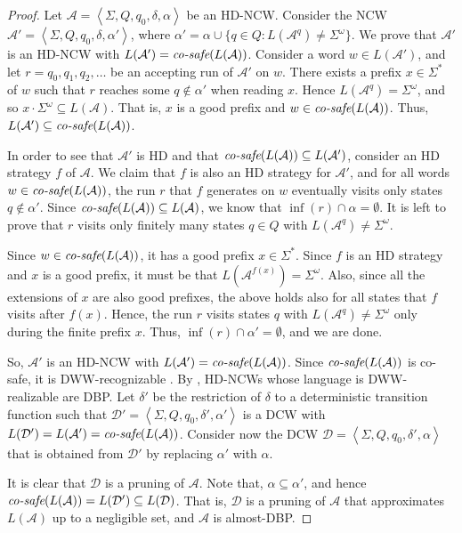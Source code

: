 \documentclass[10pt,a4paper]{amsart}
\theoremstyle{definition}
\numberwithin{equation}{section}
\newcommand{\A}{{\mathcal A}}
\newcommand{\D}{{\mathcal D}}
\newcommand{\zug}[1]{\left\langle #1 \right\rangle}
\newcommand{\cs}{\mbox{\it co-safe}}
\begin{document}
\begin{proof}Let $\A=\zug{\Sigma,Q,q_0,\delta,\alpha}$ be an HD-NCW. Consider the NCW $\A'=\zug{\Sigma,Q,q_0,\delta,\alpha'}$, where $\alpha'= \alpha\cup \{q\in Q : L(\A^q)\neq \Sigma^\omega\}$. We prove that $\A'$ is an HD-NCW with $L(\A')=\cs(L(\A))$. 
Consider a word $w\in L(\A')$, and let $r=q_0,q_1,q_2,\ldots$ be an accepting run of $\A'$ on $w$. There exists a prefix $x\in \Sigma^*$  of $w$ such that $r$ reaches some $q\notin \alpha'$ when reading $x$. Hence $L(\A^q)=\Sigma^\omega$, and so $x\cdot \Sigma^\omega\subseteq L(\A)$. That is, $x$ is a good prefix and $w\in \cs(L(\A))$. Thus, $L(\A')\subseteq \cs(L(\A))$. 

In order to see that $\A'$ is HD and that $\cs(L(\A))\subseteq L(\A')$, consider an HD strategy $f$ of $\A$. We claim that $f$ is also an HD strategy for $\A'$, and for all words $w\in \cs(L(\A))$, the run $r$ that $f$ generates on $w$ eventually visits only states $q\notin \alpha'$. Since $\cs(L(\A))\subseteq L(\A)$, we know that $\inf(r)\cap \alpha=\emptyset$. It is left to prove that $r$ visits only finitely many states $q\in Q$ with $L(\A^q)\neq\Sigma^\omega$. 

Since $w\in \cs(L(\A))$, it has a good prefix $x\in \Sigma^*$. Since $f$ is an HD strategy and $x$ is a good prefix, it must be that $L(\A^{f(x)})=\Sigma^\omega$. Also, since all the extensions of $x$ are also good prefixes, the above holds also for all states that $f$ visits after $f(x)$. Hence, the run $r$ visits states $q$ with $L(\A^q)\neq \Sigma^\omega$ only during the finite prefix $x$. Thus, $\inf(r)\cap \alpha'=\emptyset$, and we are done.

So, $\A'$ is an HD-NCW with $L(\A')=\cs(L(\A))$. Since $\cs(L(\A))$ is co-safe, it is DWW-recognizable \cite{Sis94}. By \cite{BKS17}, HD-NCWs whose language is DWW-realizable are DBP. Let $\delta'$ be the restriction of $\delta$ to a deterministic transition function such that $\D'=\zug{\Sigma,Q,q_0,\delta',\alpha'}$ is a DCW with $L(\D')=L(\A')=\cs(L(\A))$. Consider now the DCW $\D=\zug{\Sigma,Q,q_0,\delta',\alpha}$ that is obtained from $\D'$ by replacing $\alpha'$ with $\alpha$.

 It is clear that $\D$ is a pruning of $\A$. Note that, $\alpha\subseteq \alpha'$, and hence $\cs(L(\A))=L(\D')\subseteq L(\D)$. That is, $\D$ is a pruning of $\A$ that approximates $L(\A)$ up to a negligible set, and $\A$ is almost-DBP. 
\end{proof}
\end{document}
